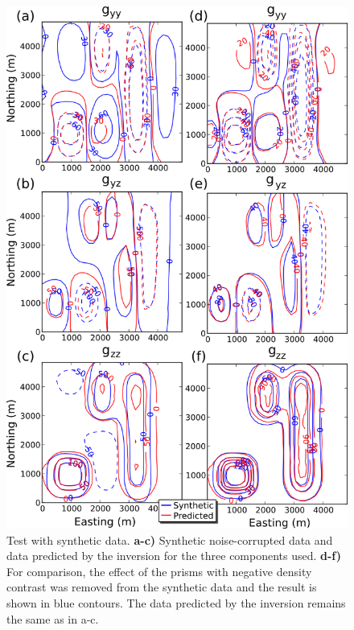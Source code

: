 \documentclass{segabs}
\begin{document}
\begin{figure}[htb]
    \centering
        \includegraphics[width=\columnwidth]{../synthetic/adjustment-vert.png}
    \caption{Test with synthetic data.
    \textbf{a-c)} Synthetic noise-corrupted data and data predicted by the inversion
    for the three components used.
    \textbf{d-f)} For comparison, the effect of the prisms with negative density contrast
    was removed from the synthetic data and the result is shown in blue contours.
    The data predicted by the inversion remains the same as in a-c.
    \label{fig:synth-data}}
    \vspace{-0.4cm}
\end{figure}
\end{document}
